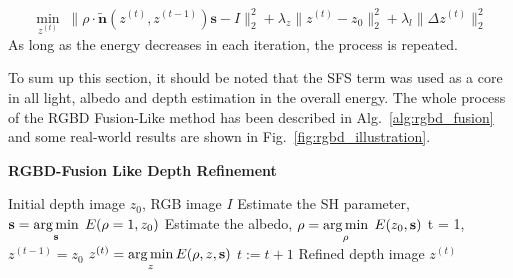 \begin{equation}\label{eq:rgbd_depth_refine2}
    \min_{z^{(t)}} \; \lVert \rho \cdot \tilde{\mathbf{n}}(z^{(t)}, z^{(t-1)}) \mathbf{s} -I\rVert^2_2 + \lambda_z \lVert z^{(t)} - z_0\rVert^2_2 + \lambda_l \lVert \Delta z^{(t)} \rVert^2_2
\end{equation}
As long as the energy decreases in each iteration, the process is repeated.

To sum up this section, it should be noted that the SFS term was used as a core in all light, albedo and depth estimation in the overall energy.
The whole process of the RGBD Fusion-Like method has been described in Alg.~\ref{alg:rgbd_fusion} and some real-world results are shown in Fig.~\ref{fig:rgbd_illustration}.



\begin{algorithm}[!htbp]
    \begin{algorithmic}[1]
          \caption{\textbf{RGBD-Fusion Like Depth Refinement}}
        \label{alg:rgbd_fusion}
         \renewcommand{\algorithmicrequire}{\textbf{Input:}}
         \renewcommand{\algorithmicensure}{\textbf{Output:}}
         \REQUIRE Initial depth image $z_0$, RGB image $I$
         \vspace{1.8mm}
         \STATE Estimate the SH parameter, $\mathbf{s} = \operatorname*{arg\,min} \limits_{\mathbf{s}} \; E(\rho = 1, z_0)$ 
         \STATE Estimate the albedo, $\rho = \operatorname*{arg\,min} \limits_{\rho} \; E(z_0, \mathbf{s})$ 
         \STATE t = 1, $z^{(t-1)} = z_0$
         \vspace{1.8mm}
           \vspace{1.8mm}
              \STATE $z^{(t)} = \operatorname*{arg\,min} \limits_{z} E(\rho, z, \mathbf{s})$ 
                  \STATE $t := t + 1$
         \vspace{1.8mm}
          \ENDWHILE
          \vspace{1.8mm}
          \ENSURE  Refined depth image $z^{(t)}$
    \end{algorithmic}
\end{algorithm}

